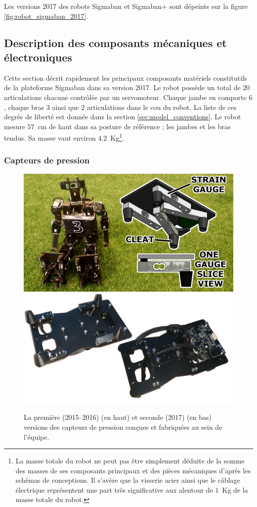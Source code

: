 Les versions 2017 des robots Sigmaban et Sigmaban+ sont dépeints
sur la figure \ref{fig:robot_sigmaban_2017}.

\subsection{Description des composants mécaniques et électroniques}

Cette section décrit rapidement les principaux composants
matériels constitutifs de la plateforme Sigmaban dans sa version 2017.
Le robot possède un total de $20$ articulations chacune contrôlée
par un servomoteur. Chaque jambe en comporte $6$, chaque bras $3$
ainsi que $2$ articulations dans le cou du robot.
La liste de ces degrés de liberté est donnée dans la section \ref{sec:model_conventions}.
Le robot mesure $57$~cm de haut dans sa posture de référence ; 
les jambes et les bras tendus.
Sa masse vaut environ $4.2$~Kg\footnote{La masse totale du robot ne peut pas être simplement 
déduite de la somme des masses de ses composants principaux et des pièces mécaniques 
d'après les schémas de conceptions.
Il s'avère que la visserie acier ainsi que le câblage électrique représentent une part
très significative aux alentour de $1$~Kg de la masse totale du robot.}.

\subsubsection{Capteurs de pression\label{sec:robot_pressure_sensors}}

\begin{figure}[htb]
    \centerfloat
    \includegraphics[width=0.8\linewidth]{../media/pressures1.png}
    \vspace{0.1cm}
    \newline
    \includegraphics[width=0.8\linewidth]{../media/pressures2.png}
    \caption{\label{fig:robot_pressures} 
        La première (2015--2016) (en haut) et seconde (2017) (en bas) versions 
        des capteurs de pression conçues et fabriquées au sein de l'équipe.
    }
\end{figure}


